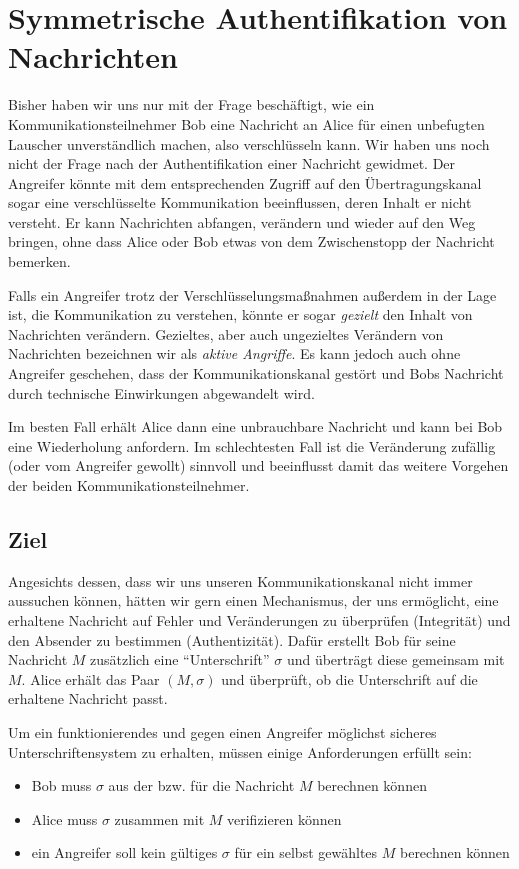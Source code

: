 \chapter{Symmetrische Authentifikation von Nachrichten}
\label{cha6}

Bisher haben wir uns nur mit der Frage beschäftigt, wie ein Kommunikationsteilnehmer Bob eine Nachricht an Alice für einen unbefugten Lauscher unverständlich
machen, also verschlüsseln kann. Wir haben uns noch nicht der Frage nach der Authentifikation einer Nachricht gewidmet. Der Angreifer könnte mit dem
entsprechenden Zugriff auf den Übertragungskanal sogar eine verschlüsselte Kommunikation beeinflussen, deren Inhalt er nicht versteht. Er kann Nachrichten
abfangen, verändern und wieder auf den Weg bringen, ohne dass Alice oder Bob etwas von dem Zwischenstopp der Nachricht bemerken.

Falls ein Angreifer trotz der Verschlüsselungsmaßnahmen außerdem in der Lage ist, die Kommunikation zu verstehen, könnte er sogar \textit{gezielt} den Inhalt
von Nachrichten verändern. Gezieltes, aber auch ungezieltes Verändern von Nachrichten bezeichnen wir als \emph{aktive Angriffe}.
Es kann jedoch auch ohne Angreifer geschehen, dass der Kommunikationskanal gestört und Bobs Nachricht durch technische Einwirkungen abgewandelt wird.

Im besten Fall erhält Alice dann eine unbrauchbare Nachricht und kann bei Bob eine Wiederholung anfordern. Im schlechtesten Fall ist die Veränderung zufällig
(oder vom Angreifer gewollt) sinnvoll und beeinflusst damit das weitere Vorgehen der beiden Kommunikationsteilnehmer.

\section{Ziel}
Angesichts dessen, dass wir uns unseren Kommunikationskanal nicht immer aussuchen können, hätten wir gern einen Mechanismus, der uns ermöglicht, eine erhaltene
Nachricht auf Fehler und Veränderungen zu überprüfen (Integrität) und den Absender zu bestimmen (Authentizität). Dafür erstellt Bob für seine Nachricht $M$
zusätzlich eine "`Unterschrift"' $\sigma$ und überträgt diese gemeinsam mit $M$. Alice erhält das Paar $(M,\sigma)$ und überprüft, ob die Unterschrift auf die
erhaltene Nachricht passt.

Um ein funktionierendes und gegen einen Angreifer möglichst sicheres Unterschriftensystem zu erhalten, müssen einige Anforderungen erfüllt sein:
\begin{itemize}
  \item Bob muss $\sigma$ aus der bzw. für die Nachricht $M$ berechnen können
  \item Alice muss $\sigma$ zusammen mit $M$ verifizieren können
  \item ein Angreifer soll kein gültiges $\sigma$ für ein selbst gewähltes $M$ berechnen können
\end{itemize} 


